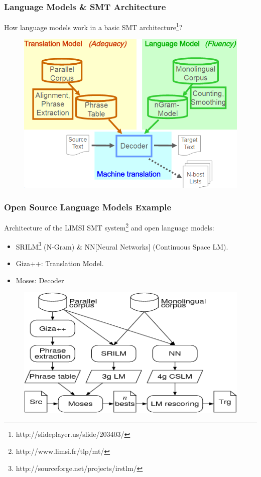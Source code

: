 \documentclass{beamer}
\begin{document}

\begin{frame} \frametitle{Language Models \& SMT Architecture}
How language models work in a basic SMT architecture\footnote{http://slideplayer.us/slide/203403/}?
\begin{figure}
\includegraphics[width=0.6\linewidth]{figure/statml_architecture.PNG}
\label{fig:statml_architecture}
\end{figure}
\end{frame}


\begin{frame}[label=go_architecture] \frametitle{Open Source Language Models Example}
Architecture of the LIMSI SMT
system\footnote{http://www.limsi.fr/tlp/mt/} and open language models:
\begin{itemize}
\item SRILM\footnote{http://sourceforge.net/projects/irstlm/} (N-Gram)
  \& NN[Neural Networks] (Continuous Space LM).
\item Giza++: Translation Model. 
\item Moses: Decoder
\end{itemize}
\begin{figure}
\includegraphics[width=0.6\linewidth]{figure/TLP_SMT_arch.png}
\label{fig:TLP_SMT_arch}
\end{figure}
\hyperlink{go_nnlm}{}
\end{frame}
\end{document}
